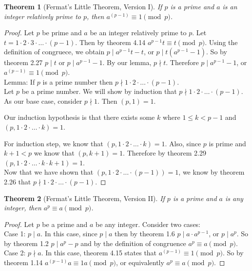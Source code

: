 \documentclass[12pt,leqno]{article}
\numberwithin{equation}{section}
\newtheorem{thm}{Theorem}[section]
\theoremstyle{definition}
\begin{document}
\begin{thm}[Fermat's Little Theorem, Version I]
If $p$ is a prime and $a$ is an integer relatively prime to $p$,
then $a^{(p-1)} \equiv 1 \pmod{p}$.
\end{thm}
\begin{proof}[Proof]
Let  $p$ be prime and $a$ be an integer relatively prime to $p$.  Let $t = 1 \cdot 2 \cdot 3 \cdot \hdots \cdot (p-1)$.  Then by theorem 4.14 $a^{p-1}t \equiv t \pmod{p}$.  Using the definition of congruece, we obtain $p \mid a^{p-1}t - t$, or $p \mid t(a^{p-1}-1)$.  So by theorem 2.27  $p \mid t$ or $p \mid a^{p-1}-1$. By our lemma, $p \nmid t$.  Therefore $p \mid a^{p-1}-1$, or $a^{(p-1)} \equiv 1 \pmod{p}$.\\

Lemma:  If $p$ is a prime number then $p \nmid 1 \cdot 2 \cdot \hdots \cdot (p-1)$.\\
Let $p$ be a prime number.  We will show by induction that $p \nmid 1 \cdot 2 \cdot \hdots \cdot (p-1)$.\\

As our base case, consider $p \nmid 1$. Then $(p, 1) = 1$.

Our induction hypothesis is that there exists some $k$ where $1 \leq k < p-1$ and $(p, 1 \cdot 2 \cdot \hdots \cdot k) = 1$.

For induction step, we know that $(p, 1 \cdot 2 \cdot \hdots \cdot k) = 1$.  Also, since $p$ is prime and $k+1 < p$ we know that $(p, k+1) = 1$.  Therefore by theorem 2.29  $(p, 1 \cdot 2 \cdot \hdots \cdot k \cdot k+1) = 1$.\\

Now that we have shown that $(p, 1 \cdot 2 \cdot \hdots \cdot (p-1)) = 1$, we know by theorem 2.26 that $p \nmid 1 \cdot 2 \cdot \hdots \cdot (p-1)$.
\end{proof}

\begin{thm}[Fermat's Little Theorem, Version II]
If $p$ is a prime and $a$ is \emph{any} integer, then $a^p \equiv a
\pmod{p}$.
\end{thm}
\begin{proof}[Proof]
Let $p$ be a prime and $a$ be any integer.  Consider two cases:\\

Case 1: $p \mid a$.  In this case, since $p \mid a$ then by theorem 1.6 $p \mid a \cdot a^{p-1}$, or $p \mid a^p$.  So by theorem 1.2 $p \mid a^p - p$ and by the definition of congruence $a^p \equiv a \pmod{p}$.\\

Case 2: $p \nmid a$.  In this case, theorem 4.15 states that $a^{(p-1)} \equiv 1 \pmod{p}$.  So by theorem 1.14   $a^{(p-1)}a \equiv 1a \pmod{p}$, or equivalently $a^p \equiv a \pmod{p}$.
\end{proof}
\end{document}

